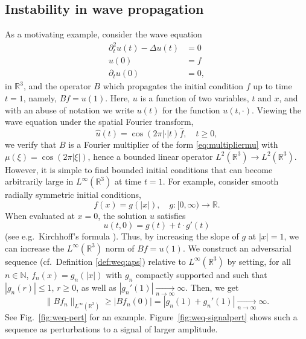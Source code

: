 \documentclass{article}
\theoremstyle{definition}
\newcommand{\N}{\mathbb{N}}
\newcommand{\R}{\mathbb{R}}
\newcommand{\abs}[1]{\left\lvert#1\right\rvert}
\newcommand{\enorm}[1]{\abs{#1}}
\newcommand{\fhat}[1]{\widehat{#1}}
\begin{document}
\subsection{Instability in wave propagation}
\label{sec:weqzeroinit}
As a motivating example, consider the wave equation
\begin{align*}
    \partial_t^2 u(t) - \Delta u(t) & = 0\\
    u(0) & = f\\
    \partial_tu(0) & = 0,
\end{align*}
in \(\R^3\),
and the operator \(B\) which propagates the initial condition \(f\) up to time \(t=1\), namely, $Bf = u(1)$. Here, $u$ is a function of two variables, $t$ and $x$, and with an abuse of notation we write $u(t)$ for the function $u(t,\cdot)$.
Viewing the wave equation under the spatial Fourier transform,
\begin{equation*}
    \fhat{u}(t) = \cos\left(2\pi\enorm{\cdot}t\right)\fhat{f},\quad t\geq 0,
\end{equation*}
we verify that \(B\) is a Fourier multiplier of the form \eqref{eq:multipliermu} with $\mu(\xi) = \cos\left(2\pi |\xi|\right)$, hence a bounded linear operator \(L^2(\R^3)\to L^2(\R^3)\).
However,
it is simple to find bounded initial conditions that can become arbitrarily large in \(L^\infty(\R^3)\) at time \(t=1\).
For example,
consider smooth radially symmetric initial conditions,
\begin{equation*}
    f(x) = g(\enorm{x}),\quad g\colon [0,\infty)\to\R.
\end{equation*}
When evaluated at \(x=0\), the solution \(u\) satisfies
\begin{equation*}
    u(t,0)
    = g(t) + t\cdot g'(t)
\end{equation*}
(see e.g.\ Kirchhoff's formula \cite[\S 12]{vladimirov1971}).
Thus, by increasing the slope of \(g\) at \(\enorm{x}=1\), we can increase the \(L^\infty(\R^3)\) norm of \(Bf=u(1)\).
We construct an adversarial sequence (cf.\ Definition \ref{def:weq:aps}) relative to \(L^\infty(\R^3)\)
by setting,
for all \(n\in\N\),
\(f_n(x)=g_n(\enorm{x})\) with $g_n$ compactly supported and such that \(\abs{g_n(r)}\leq 1\), \(r\geq 0\),  as well as \(\abs{g_n'(1)}\xrightarrow[n\to\infty]{}\infty\).
Then, we get
\begin{equation*}
   \|Bf_n\|_{L^\infty(\R^3)}\ge \abs{Bf_n(0)} = \abs{g_n(1) + g_n'(1)}\xrightarrow[n\to\infty]{} \infty.
\end{equation*}
See Fig.~\ref{fig:weq-pert} for an example. Figure~\ref{fig:weq-signalpert} shows such a sequence as perturbations to a signal of larger amplitude.
\end{document}
